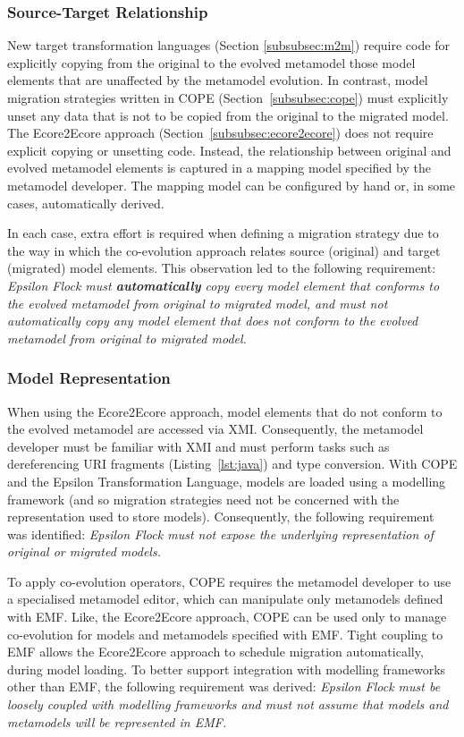 \subsubsection{Source-Target Relationship}
New target transformation languages (Section \ref{subsubsec:m2m}) require code for explicitly copying from the original to the evolved metamodel those model elements that are unaffected by the metamodel evolution. In contrast, model migration strategies written in COPE (Section~\ref{subsubsec:cope}) must explicitly unset any data that is not to be copied from the original to the migrated model. The Ecore2Ecore approach (Section~\ref{subsubsec:ecore2ecore}) does not require explicit copying or unsetting code. Instead, the relationship between original and evolved metamodel elements is captured in a mapping model specified by the metamodel developer. The mapping model can be configured by hand or, in some cases, automatically derived. 

In each case, extra effort is required when defining a migration strategy due to the way in which the co-evolution approach relates source (original) and target (migrated) model elements. This observation led to the following requirement: \emph{Epsilon Flock must \textbf{automatically} copy every model element that conforms to the evolved metamodel from original to migrated model, and must not automatically copy any model element that does not conform to the evolved metamodel from original to migrated model.}


\subsubsection{Model Representation}
When using the Ecore2Ecore approach, model elements that do not conform to the evolved metamodel are accessed via XMI. Consequently, the metamodel developer must be familiar with XMI and must perform tasks such as dereferencing URI fragments (Listing~\ref{lst:java}) and type conversion. With COPE and the Epsilon Transformation Language, models are loaded using a modelling framework (and so migration strategies need not be concerned with the representation used to store models). Consequently, the following requirement was identified: \emph{Epsilon Flock must not expose the underlying representation of original or migrated models.}

To apply co-evolution operators, COPE requires the metamodel developer to use a specialised metamodel editor, which can manipulate only metamodels defined with EMF. Like, the Ecore2Ecore approach, COPE can be used only to manage co-evolution for models and metamodels specified with EMF. Tight coupling to EMF allows the Ecore2Ecore approach to schedule migration automatically, during model loading. To better support integration with modelling frameworks other than EMF, the following requirement was derived: \emph{Epsilon Flock must be loosely coupled with modelling frameworks and must not assume that models and metamodels will be represented in EMF.}


